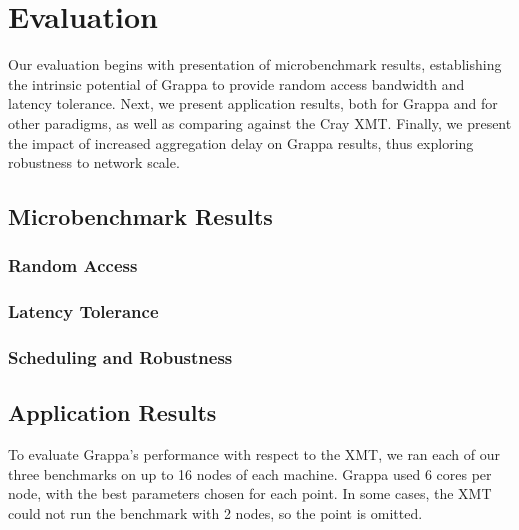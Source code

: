 \section{Evaluation} \label{sec:evaluation}
Our evaluation begins with presentation of microbenchmark results, establishing
the intrinsic potential of Grappa to provide random access bandwidth and latency tolerance.
Next, we present application results, both for Grappa and for other paradigms, as well
as comparing against the Cray XMT.  Finally, we present the impact of increased aggregation delay
on Grappa results, thus exploring robustness to network scale.

\subsection{Microbenchmark Results}
\subsubsection{Random Access}
\subsubsection{Latency Tolerance}
\subsubsection{Scheduling and Robustness}

\subsection{Application Results}
To evaluate Grappa's performance with respect to the XMT, we ran each
of our three benchmarks on up to 16 nodes of each machine. Grappa used
6 cores per node, with the best parameters chosen for each point. In
some cases, the XMT could not run the benchmark with 2 nodes, so the
point is omitted. 
